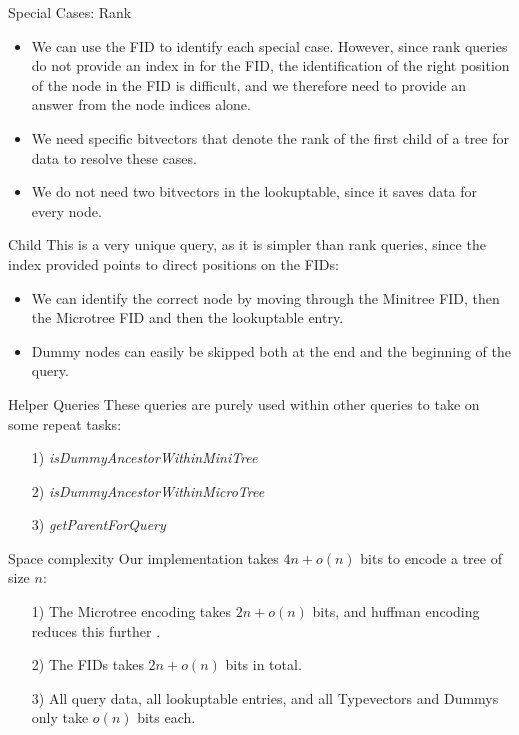 \documentclass{beamer}
\begin{document}
\begin{frame}{Special Cases: Rank}
	\begin{itemize}
	\item
		We can use the FID to identify each special case. However, since rank queries do not provide an index in for the FID, the identification of the right position of the node in the FID is difficult, and we therefore need to provide an answer from the node indices alone.
	\item
		We need specific bitvectors that denote the rank of the first child of a tree for data to resolve these cases.
	\item
		We do not need two bitvectors in the lookuptable, since it saves data for every node.
	\end{itemize}
\end{frame}

\begin{frame}{Child}
	This is a very unique query, as it is simpler than rank queries, since the index provided points to direct positions on the FIDs:
	\begin{itemize}
	\item
		We can identify the correct node by moving through the Minitree FID, then the Microtree FID and then the lookuptable entry.
	\item
		Dummy nodes can easily be skipped both at the end and the beginning of the query.
	\end{itemize}
\end{frame}

\begin{frame}{Helper Queries}
	These queries are purely used within other queries to take on some repeat tasks:
	\begin{itemize}
	\item[1)] \textit{isDummyAncestorWithinMiniTree}
	\item[2)] \textit{isDummyAncestorWithinMicroTree}
	\item[3)] \textit{getParentForQuery}
	\end{itemize}
\end{frame}

\begin{frame}{Space complexity}
	Our implementation takes $4n + o(n)$ bits to encode a tree of size $n$:
	\begin{itemize}
	\item[1)] The Microtree encoding takes $2n + o(n)$ bits, and huffman encoding reduces this further \cite{universalSuccinct}.
	\item[2)] The FIDs takes $2n + o(n)$ bits in total.
	\item[3)] All query data, all lookuptable entries, and all Typevectors and Dummys only take $o(n)$ bits each.
	\end{itemize}
\end{frame}
\end{document}
